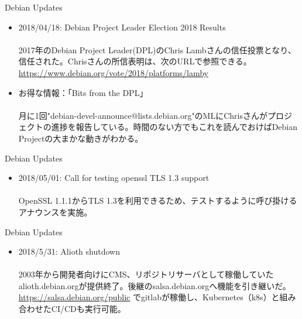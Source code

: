 \begin{frame}{Debian Updates}%

\begin{itemize}
\item 2018/04/18: Debian Project Leader Election 2018 Results\\
\ \\
  \small{2017年のDebian Project Leader(DPL)のChris Lambさんの信任投票となり、信任された。Chrisさんの所信表明は、次のURLで参照できる。\url{https://www.debian.org/vote/2018/platforms/lamby}}


\item お得な情報：「Bits from the DPL」\\
\ \\
  \small{月に1回"debian-devel-announce@lists.debian.org"のMLにChrisさんがプロジェクトの進捗を報告している。時間のない方でもこれを読んでおけばDebian Projectの大まかな動きがわかる。}

\end{itemize}

\end{frame}


\begin{frame}{Debian Updates}%

\begin{itemize}
\item 2018/05/01: Call for testing openssl TLS 1.3 support\\
\ \\
  \small{OpenSSL 1.1.1からTLS 1.3を利用できるため、テストするように呼び掛けるアナウンスを実施。}


%
  
\end{itemize}

\end{frame}


\begin{frame}{Debian Updates}%

\begin{itemize}
\item 2018/5/31:  Alioth shutdown\\
\ \\
  \small{2003年から開発者向けにCMS、リポジトリサーバとして稼働していたalioth.debian.orgが提供終了。後継のsalsa.debian.orgへ機能を引き継いだ。\url{https://salsa.debian.org/public} でgitlabが稼働し、Kubernetes（k8s）と組み合わせたCI/CDも実行可能。}

\end{itemize}

\end{frame}


